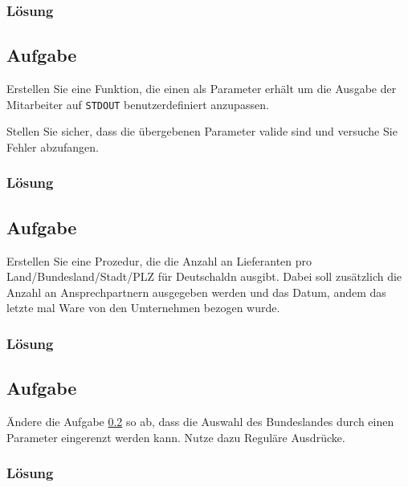 \subsubsection*{Lösung}
\label{sec:uebung_07.aufgabe_02.loesung}

\subsection{Aufgabe}
\label{sec:uebung_07.aufgabe_03}
Erstellen Sie eine Funktion, die einen  als Parameter erhält um die Ausgabe der Mitarbeiter auf \texttt{STDOUT} benutzerdefiniert anzupassen.

\begin{example-popup}
\end{example-popup}

Stellen Sie sicher, dass die übergebenen Parameter valide sind und versuche Sie Fehler abzufangen.

\subsubsection*{Lösung}
\label{sec:uebung_07.aufgabe_03.loesung}

\subsection{Aufgabe}
\label{sec:uebung_07.aufgabe_04}
Erstellen Sie eine Prozedur, die die Anzahl an Lieferanten pro Land/Bundesland/Stadt/PLZ für Deutschaldn ausgibt. Dabei soll zusätzlich die Anzahl an Ansprechpartnern ausgegeben werden und das Datum, andem das letzte mal Ware von den Umternehmen bezogen wurde.

\subsubsection*{Lösung}
\label{sec:uebung_07.aufgabe_04.loesung}

\subsection{Aufgabe}
\label{sec:uebung_07.aufgabe_05}
Ändere die Aufgabe \ref{sec:uebung_07.aufgabe_04} so ab, dass die Auswahl des Bundeslandes durch einen Parameter eingerenzt werden kann. Nutze dazu Reguläre Ausdrücke.

\subsubsection*{Lösung}
\label{sec:uebung_07.aufgabe_05.loesung}
